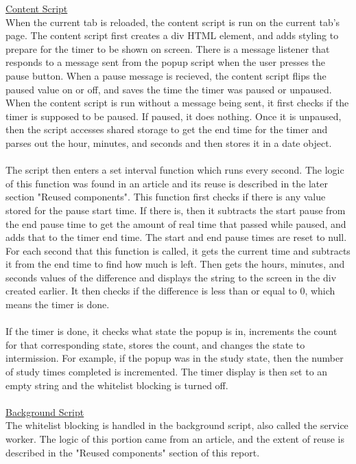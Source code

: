 \documentclass[12pt]{article}
\begin{document}
\underline{Content Script}\\
When the current tab is reloaded, the content script is run on the current tab's page. The content script first creates a div HTML element, and adds styling to prepare 
for the timer to be shown on screen. There is a message listener that responds to a message sent from the popup script 
when the user presses the pause button. When a pause message is recieved, the content script flips the paused value on or off, and saves the time the timer was paused or unpaused. 
When the content script is run without a message being sent, it first checks if the timer is supposed to be paused. If paused, it does nothing. Once it is unpaused, then 
the script accesses shared storage to get the end time for the timer and parses out the hour, minutes, and seconds and then stores it in a date object. 
\\\\The script then enters a set interval function which runs every second. The logic of this function was found in an article and its reuse is described in the later section "Reused components". 
This function first checks if there is any value stored for the pause start time. If there is, 
then it subtracts the start pause from the end pause time to get the amount of real time that passed while paused, and adds that to the timer end time. 
The start and end pause times are reset to null. For each second that this function is called, it gets the current time and subtracts it from the 
end time to find how much is left. Then gets the hours, minutes, and seconds values of the difference and displays the string to the screen in the div created earlier. 
It then checks if the difference is less than or equal to 0, which means the timer is done. 
\\\\If the timer is done, it checks what state the popup is in, increments the count for that corresponding state, stores the count, and changes the state to intermission. 
For example, if the popup was in the study state, then the number of study times completed is incremented. The timer display is then set to an empty string and the whitelist blocking is turned off. 
\\\\
\underline{Background Script}\\
The whitelist blocking is handled in the background script, also called the service worker. The logic of this portion came from an article, and the extent of reuse is described in the "Reused components" section of this report. 
\end{document}
